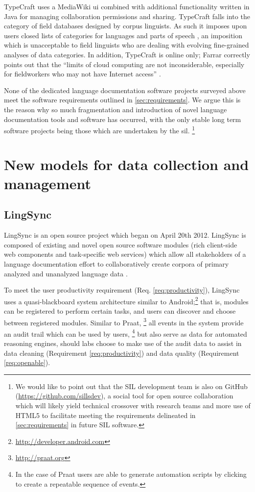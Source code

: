\documentclass[11pt]{article}
\begin{document}
TypeCraft uses a MediaWiki \gls{ui} combined with additional functionality
written in Java for managing collaboration permissions and sharing. TypeCraft
falls into the category of field databases designed by corpus linguists. As
such it imposes upon users closed lists of categories for languages and parts
of speech \cite{Farrar:2010}, an imposition which is unacceptable to field
linguists who are dealing with evolving fine-grained analyses of data
categories. In addition, TypeCraft is online only; Farrar correctly points out
that the ``limits of cloud computing are not inconsiderable, especially for
fieldworkers who may not have Internet access'' \cite{Farrar:2010}.

None of the dedicated language documentation software projects surveyed above
meet the software requirements outlined in \autoref{sec:requirements}.  We
argue this is the reason why so much fragmentation and introduction of novel
language documentation tools and software has occurred, with the only stable
long term software projects being those which are undertaken by the \gls{sil}.%
\footnote{We would like to point out that the SIL development team is also on
    GitHub (\url{https://github.com/sillsdev}), a social tool for open source
    collaboration which will likely yield technical crossover with research
    teams and more use of HTML5 to facilitate meeting the requirements
delineated in \autoref{sec:requirements} in future SIL software.} %



\section{New models for data collection and management}
\label{sec:lingsync-old}


\subsection{LingSync}\label{sec:lingsync}

LingSync is an open source project which began on April 20th 2012. LingSync is
composed of existing and novel open source software modules (rich client-side
web components and task-specific web services) which allow all stakeholders of
a language documentation effort to collaboratively create corpora of primary
analyzed and unanalyzed language data \cite{lingsync:2012}.

To meet the user productivity requirement (Req. \autoref{req:productivity}),
LingSync uses a quasi-blackboard system architecture similar to
Android;\footnote{\url{http://developer.android.com}} that is, modules can be
registered to perform certain tasks, and users can discover and choose between
registered modules. Similar to Praat,%
\footnote{\url{http://praat.org}} %
all events in the system provide an audit trail which can be used by users,%
\footnote{In the case of Praat users are able to generate automation scripts by
clicking to create a repeatable sequence of events.}
but also serve as data for automated reasoning engines, should labs choose to
make use of the audit data to assist in data cleaning (Requirement
\autoref{req:productivity}) and data quality (Requirement
\autoref{req:openable}).
\end{document}
